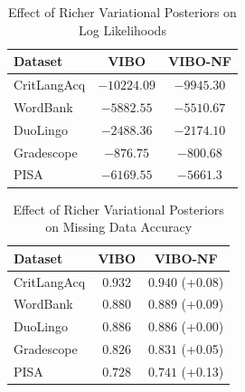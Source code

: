 \begin{table}
    \caption{Effect of Richer Variational Posteriors on Log Likelihoods}
    \label{table:loglike:flows}
    \begin{center}
    \begin{tabular}{lcc}
    \hline
    Dataset & VIBO & VIBO-NF \\
    \hline
    CritLangAcq & $-10224.09$ & $-9945.30$ \\
    WordBank & $-5882.55$ & $-5510.67$ \\
    DuoLingo & $-2488.36$ & $-2174.10$\\
    Gradescope & $-876.75$ & $-800.68$ \\
    PISA & $-6169.55$ & $-5661.3$ \\
    \hline
    \end{tabular}
    \end{center}
\end{table}

\begin{table}
    \caption{Effect of Richer Variational Posteriors on Missing Data Accuracy}
    \label{table:accuracy:flows}
    \begin{center}
    \begin{tabular}{lcc}
    \hline
    Dataset & VIBO & VIBO-NF \\
    \hline
    CritLangAcq & $0.932$ & $0.940$ \small{(+0.08)} \\
    WordBank & $0.880$ & $0.889$ \small{(+0.09)}\\
    DuoLingo & $0.886$ & $0.886$ \small{(+0.00)}\\
    Gradescope & $0.826$ & $0.831$ \small{(+0.05)}\\
    PISA & $0.728$ & $0.741$ \small{(+0.13)} \\
    \hline
    \end{tabular}
    \end{center}
\end{table}


